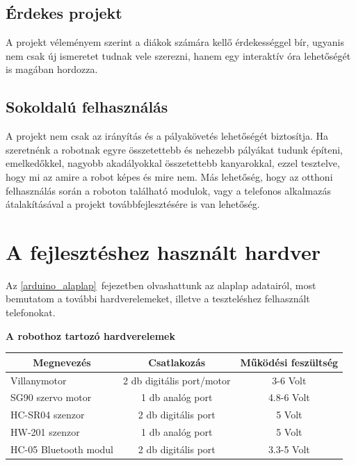 \documentclass[]{thesis-ekf}
\theoremstyle{definition}
\begin{document}
\subsection{Érdekes projekt}
A projekt véleményem szerint a diákok számára kellő érdekességgel bír, ugyanis nem csak új ismeretet tudnak vele szerezni, hanem egy interaktív óra lehetőségét is magában hordozza.
\subsection{Sokoldalú felhasználás}
A projekt nem csak az irányítás és a pályakövetés lehetőségét biztosítja. Ha szeretnénk a robotnak egyre összetettebb és nehezebb pályákat tudunk építeni, emelkedőkkel, nagyobb akadályokkal összetettebb kanyarokkal, ezzel tesztelve, hogy mi az amire a robot képes és mire nem. Más lehetőség, hogy az otthoni felhasználás során a roboton található modulok, vagy a telefonos alkalmazás átalakításával a projekt továbbfejlesztésére is van lehetőség.
\section{A fejlesztéshez használt hardver}\label{telefonok}
Az \ref{arduino_alaplap}~fejezetben olvashattunk az alaplap adatairól, most bemutatom a további hardverelemeket, illetve a teszteléshez felhasznált telefonokat.

\textbf{A robothoz tartozó hardverelemek}
\begin{center}
	\begin{tabular}{|l|c|c|}
		\hline
		\multicolumn{1}{|c|}{\textbf{Megnevezés}}&\textbf{Csatlakozás}&\textbf{Működési feszültség}\\
		\hline
		Villanymotor&2 db digitális port/motor&3-6 Volt\\
		\hline
		SG90 szervo motor&1 db analóg port&4.8-6 Volt\\
		\hline
		HC-SR04 szenzor&2 db digitális port&5 Volt\\
		\hline
		HW-201 szenzor&1 db analóg port&5 Volt\\
		\hline
		HC-05 Bluetooth modul&2 db digitális port&3.3-5 Volt\\
		\hline
	\end{tabular}
\end{center}
\end{document}
